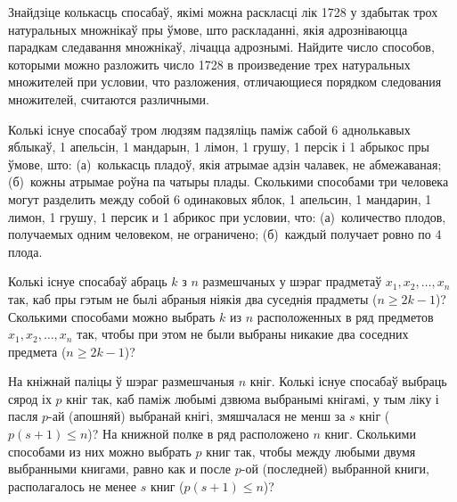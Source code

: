 \documentclass[12pt, a4paper]{article}
\begin{document}
\begin{problemList}
\smallskip

\problemItemSimple
{Знайдзіце колькасць спосабаў, якімі можна раскласці лік 1728 у здабытак
трох натуральных множнікаў пры ўмове, што раскладанні, якія адрозніваюцца парадкам
следавання множнікаў, лічацца адрознымі.}
{Найдите число способов, которыми можно разложить число 1728 в
произведение трех натуральных множителей при условии, что разложения,
отличающиеся порядком следования множителей, считаются различными.}

\bigskip

\problemItemSimple
{Колькі існуе спосабаў тром людзям падзяліць паміж сабой 6 аднолькавых яблыкаў,
1 апельсін, 1 мандарын, 1 лімон, 1 грушу, 1 персік і 1 абрыкос пры ўмове, што:
(а)~колькасць пладоў, якія атрымае адзін чалавек, не абмежаваная; (б)~кожны атрымае
роўна па чатыры плады.}
{Сколькими способами три человека могут разделить между собой 6
одинаковых яблок, 1 апельсин, 1 мандарин, 1 лимон, 1 грушу, 1 персик
и 1 абрикос при условии, что: (а)~количество плодов, получаемых одним
человеком, не ограничено; (б)~каждый получает ровно по 4 плода.}

\bigskip

\problemItemSimple
{Колькі існуе спосабаў абраць $k$ з $n$ размешчаных у шэраг прадметаў
$x_1, x_2, \dots, x_n$ так, каб пры гэтым не былі абраныя ніякія два
суседнія прадметы ($n \ge 2k - 1$)?}
{Сколькими способами можно выбрать $k$ из $n$ расположенных в ряд
предметов $x_1, x_2, \dots, x_n$ так, чтобы при этом не были выбраны
никакие два соседних предмета ($n \ge 2k - 1$)?}

\bigskip

\problemItemSimple
{На кніжнай паліцы ў шэраг размешчаныя $n$ кніг. Колькі існуе спосабаў выбраць
сярод іх $p$ кніг так, каб паміж любымі дзвюма выбранымі кнігамі, у тым ліку
і пасля $p$-ай (апошняй) выбранай кнігі, змяшчалася не менш за $s$ кніг
($p(s + 1) \le n$)?}
{На книжной полке в ряд расположено $n$ книг. Сколькими способами из
них можно выбрать $p$ книг так, чтобы между любыми двумя выбранными
книгами, равно как и после $p$-ой (последней) выбранной книги,
располагалось не менее $s$ книг ($p(s + 1) \le n$)?}

\end{problemList}
\end{document}

